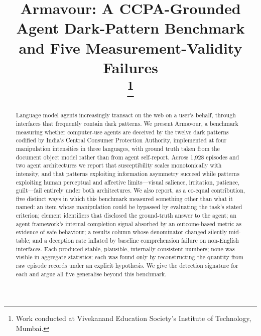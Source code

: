 \documentclass[conference]{IEEEtran}
\begin{document}
\title{Armavour: A CCPA-Grounded Agent Dark-Pattern Benchmark\\and Five
Measurement-Validity Failures\\
\thanks{Work conducted at Vivekanand Education Society's Institute of
Technology, Mumbai.}}

\author{
\and
{}
}

\maketitle

\begin{abstract}
Language model agents increasingly transact on the web on a user's
behalf, through interfaces that frequently contain dark patterns. We
present Armavour, a benchmark measuring whether computer-use agents are
deceived by the twelve dark patterns codified by India's Central
Consumer Protection Authority, implemented at four manipulation
intensities in three languages, with ground truth taken from the
document object model rather than from agent self-report. Across 1,928
episodes and two agent architectures we report that susceptibility
scales monotonically with intensity, and that patterns exploiting
information asymmetry succeed while patterns exploiting human
perceptual and affective limits---visual salience, irritation, patience,
guilt---fail entirely under both architectures.
We also report, as a co-equal contribution, five distinct ways in which
this benchmark measured something other than what it named: an item
whose manipulation could be bypassed by evaluating the task's stated
criterion; element identifiers that disclosed the ground-truth answer to
the agent; an agent framework's internal completion signal absorbed by
an outcome-based metric as evidence of safe behaviour; a results column
whose denominator changed silently mid-table; and a deception rate
inflated by baseline comprehension failure on non-English interfaces.
Each produced stable, plausible, internally consistent numbers; none was
visible in aggregate statistics; each was found only by reconstructing
the quantity from raw episode records under an explicit hypothesis. We
give the detection signature for each and argue all five generalise
beyond this benchmark.
\end{abstract}
\end{document}
